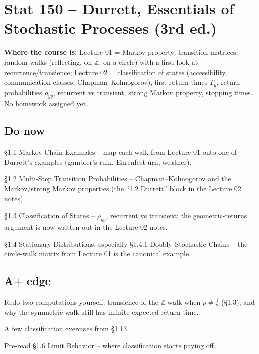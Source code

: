 \documentclass[11pt]{article}
\begin{document}
\section*{Stat 150 -- Durrett, Essentials of Stochastic Processes (3rd ed.)}
\textbf{Where the course is:} Lecture 01 = Markov property, transition matrices,
random walks (reflecting, on $\mathbb{Z}$, on a circle) with a first look at
recurrence/transience; Lecture 02 = classification of states (accessibility,
communication classes, Chapman--Kolmogorov), first return times $T_y$, return
probabilities $\rho_{yy}$, recurrent vs transient, strong Markov property,
stopping times. No homework assigned yet.

\subsection*{Do now}
\begin{todo}
  \item \S1.1 Markov Chain Examples -- map each walk from Lecture 01 onto one
    of Durrett's examples (gambler's ruin, Ehrenfest urn, weather).
  \item \S1.2 Multi-Step Transition Probabilities -- Chapman--Kolmogorov and
    the Markov/strong Markov properties (the ``1.2 Durrett'' block in the
    Lecture 02 notes).
  \item \S1.3 Classification of States -- $\rho_{yy}$, recurrent vs transient;
    the geometric-returns argument is now written out in the Lecture 02 notes.
  \item \S1.4 Stationary Distributions, especially \S1.4.1 Doubly Stochastic
    Chains -- the circle-walk matrix from Lecture 01 is the canonical example.
\end{todo}

\subsection*{A+ edge}
\begin{todo}
  \item Redo two computations yourself: transience of the $\mathbb{Z}$ walk
    when $p \neq \frac{1}{2}$ (\S1.3), and why the symmetric walk still has
    infinite expected return time.
  \item A few classification exercises from \S1.13.
  \item Pre-read \S1.6 Limit Behavior -- where classification starts paying off.
\end{todo}
\end{document}
